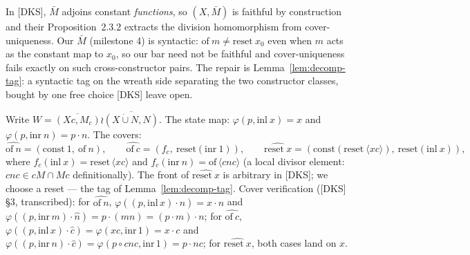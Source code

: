 \begin{remark}\label{rem:bar-gap}
  In [DKS], $\bar M$ adjoins constant \emph{functions}, so
  $(X, \bar M)$ is faithful by construction and their
  Proposition~2.3.2 extracts the division homomorphism from
  cover-uniqueness. Our $\bar M$ (milestone 4) is syntactic:
  $\mathrm{of}\ m \neq \mathrm{reset}\ x_0$ even when $m$ acts as the
  constant map to $x_0$, so our bar need not be faithful and
  cover-uniqueness fails exactly on such cross-constructor pairs.
  The repair is Lemma~\ref{lem:decomp-tag}: a syntactic tag on the
  wreath side separating the two constructor classes, bought by one
  free choice [DKS] leave open.
\end{remark}

\begin{definition}\label{def:decomp-covers}
  \leanok
  Write $W = \overline{(Xc, M_c)} \wr
  \overline{(X \mathbin{\dot\cup} N, N)}$. The state map:
  $\varphi(p, \mathrm{inl}\ x) = x$ and
  $\varphi(p, \mathrm{inr}\ n) = p \cdot n$. The covers:
  \[
  \widehat{\mathrm{of}\ n} = (\mathrm{const}\ 1,\ \mathrm{of}\ n),
  \qquad
  \widehat{\mathrm{of}\ c} = (f_c,\ \mathrm{reset}(\mathrm{inr}\ 1)),
  \qquad
  \widehat{\mathrm{reset}\ x} =
    (\mathrm{const}(\mathrm{reset}\ \langle x c\rangle),\
     \mathrm{reset}(\mathrm{inl}\ x)),
  \]
  where $f_c(\mathrm{inl}\ x) = \mathrm{reset}\,\langle x c\rangle$ and
  $f_c(\mathrm{inr}\ n) = \mathrm{of}\,\langle c n c\rangle$ (a local
  divisor element: $cnc \in cM \cap Mc$ definitionally). The front of
  $\widehat{\mathrm{reset}\ x}$ is arbitrary in [DKS]; we choose a
  reset — the tag of Lemma~\ref{lem:decomp-tag}. Cover verification
  ([DKS] §3, transcribed): for $\widehat{\mathrm{of}\ n}$,
  $\varphi((p,\mathrm{inl}\,x)\cdot\widehat{n}) = x\cdot n$ and
  $\varphi((p,\mathrm{inr}\,m)\cdot\widehat{n}) = p\cdot(mn) =
  (p\cdot m)\cdot n$; for $\widehat{\mathrm{of}\ c}$,
  $\varphi((p,\mathrm{inl}\,x)\cdot\widehat{c}) =
  \varphi(x c, \mathrm{inr}\,1) = x\cdot c$ and
  $\varphi((p,\mathrm{inr}\,n)\cdot\widehat{c}) =
  \varphi(p \circ cnc, \mathrm{inr}\,1) = p\cdot nc$; for
  $\widehat{\mathrm{reset}\ x}$, both cases land on $x$.
\end{definition}

